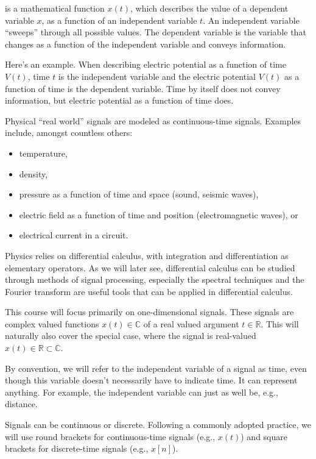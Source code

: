  is a mathematical function $x(t)$, which describes the value of a  dependent variable $x$, as a function of an independent variable $t$. An independent variable ``sweeps'' through all possible values. The dependent variable is the variable that changes as a function of the independent variable and conveys information.

Here's an example. When describing electric potential as a function of time $V(t)$, time $t$ is the independent variable and the electric potential $V(t)$ as a function of time is the dependent variable. Time by itself does not convey information, but electric potential as a function of time does.

Physical ``real world'' signals are modeled as continuous-time signals. Examples include, amongst countless others:
\begin{itemize}
 \setlength\itemsep{0.25em}        
\item temperature,
\item density,
\item pressure as a function of time and space (sound, seismic waves),
\item electric field as a function of time and position
  (electromagnetic waves), or
\item electrical current in a circuit.
\end{itemize}
Physics relies on differential calculus, with integration and differentiation as elementary operators. As we will later see, differential calculus can be studied through methods of signal processing, especially the spectral techniques and the Fourier transform are useful tools that can be applied in differential calculus.

This course will focus primarily on one-dimensional signals. These signals are complex valued functions $x(t) \in \mathbb{C}$ of a real valued argument $t\in \mathbb{R}$. This will naturally also cover the
special case, where the signal is real-valued
$x(t) \in \mathbb{R} \subset\mathbb{C}$. 

By convention, we will refer to the independent variable of a signal as time, even though this variable doesn't necessarily have to indicate time. It can represent anything. For example, the independent variable can just as well be, e.g., distance.

Signals can be continuous or discrete. Following a commonly adopted practice, we will use round brackets for continuous-time signals (e.g., $x(t)$) and square brackets for discrete-time signals (e.g., $x[n]$). 

